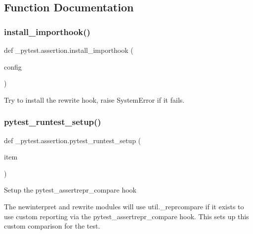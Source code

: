 \subsection{Function Documentation}
\mbox{\label{namespace__pytest_1_1assertion_a00eeb8dd8f386c69e73741d12ab8a204}} 
\subsubsection{\texorpdfstring{install\+\_\+importhook()}{install\_importhook()}}
{\footnotesize\ttfamily def \+\_\+pytest.\+assertion.\+install\+\_\+importhook (\begin{DoxyParamCaption}\item[{}]{config }\end{DoxyParamCaption})}

\begin{DoxyVerb}Try to install the rewrite hook, raise SystemError if it fails.\end{DoxyVerb}
 \mbox{\label{namespace__pytest_1_1assertion_a22e8b90bf006e6950f78877966756b8f}} 
\subsubsection{\texorpdfstring{pytest\+\_\+runtest\+\_\+setup()}{pytest\_runtest\_setup()}}
{\footnotesize\ttfamily def \+\_\+pytest.\+assertion.\+pytest\+\_\+runtest\+\_\+setup (\begin{DoxyParamCaption}\item[{}]{item }\end{DoxyParamCaption})}

\begin{DoxyVerb}Setup the pytest_assertrepr_compare hook

The newinterpret and rewrite modules will use util._reprcompare if
it exists to use custom reporting via the
pytest_assertrepr_compare hook.  This sets up this custom
comparison for the test.
\end{DoxyVerb}
 \mbox{\label{namespace__pytest_1_1assertion_ae67a9be38000c6db37ac5f7775e6ad33}} 

